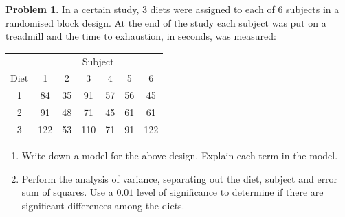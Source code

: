\documentclass[11pt,a4paper]{article}
\theoremstyle{definition}
\newtheorem{problemx}{Problem}[section]
\newenvironment{problem}{\begin{problemx}}{\end{problemx}}
\begin{document}
\begin{problem}
In a certain study, $3$ diets were assigned to each of $6$ subjects in a randomised block
design. At the end of the study each subject was put on a treadmill and the time to
exhaustion, in seconds, was measured:
\begin{table}[H]
\centering
\begin{tabular}{c|cccccc}
& \multicolumn{6}{c}{Subject}\\
Diet & 1 & 2 & 3 & 4 & 5 & 6\\
\hline
1 & 84 & 35 & 91 & 57 & 56 & 45\\
2 & 91 & 48 & 71 & 45 & 61 & 61\\
3 & 122 & 53 & 110 & 71 & 91 & 122\\
\end{tabular}
\end{table}
\begin{enumerate}
\item[(a).] Write down a model for the above design. Explain each term in the model.
\item[(b).] Perform the analysis of variance, separating out the diet, subject and error
sum of squares. Use a $0.01$ level of significance to determine if there are significant
differences among the diets.
\end{enumerate}
\end{problem}
\end{document}
